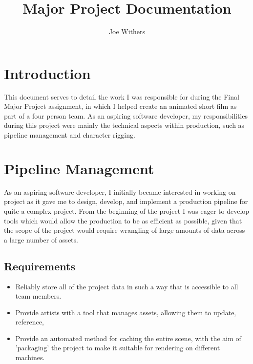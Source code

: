 \documentclass[11pt]{article}
\title{\textbf{Major Project Documentation}}
\author{Joe Withers}
\date{}
\begin{document}
\maketitle

\tableofcontents
\newpage

\section{Introduction}

This document serves to detail the work I was responsible for during the Final Major Project assignment, in which I helped create an animated short film as part of a four person team.
As an aspiring software developer, my responsibilities during this project were mainly the technical aspects within production, such as pipeline management and character rigging. %

\section{Pipeline Management}

As an aspiring software developer, I initially became interested in working on project as it gave me to design, develop, and implement a production pipeline for quite a complex project. From the beginning of the project I was eager to develop tools which would allow the production to be as efficient as possible, given that the scope of the project would require wrangling of large amounts of data across a large number of assets.

\subsection{Requirements}

\begin{itemize}

\item Reliably store all of the project data in such a way that is accessible to all team members.

\item Provide artists with a tool that manages assets, allowing them to update, reference,

\item Provide an automated method for caching the entire scene, with the aim of 'packaging' the project to make it suitable for rendering on different machines.

\end{itemize}
\end{document}
